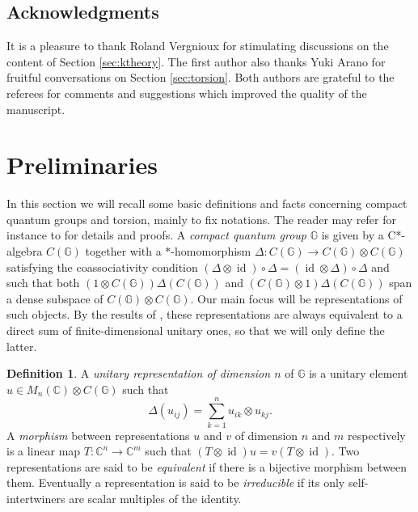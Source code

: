 \documentclass[a4paper, 11pt]{amsart}
\theoremstyle{plain}
\theoremstyle{definition}
\newtheorem{de}[thm]{Definition}
\theoremstyle{remark}
\DeclareMathOperator{\id}{id}
\newcommand{\C}{\mathbb{C}}
\newcommand{\D}{\Delta}
\newcommand{\G}{\mathbb{G}}
\begin{document}
\subsection*{Acknowledgments}

It is a pleasure to thank Roland Vergnioux for stimulating discussions on the content of Section \ref{sec:ktheory}. The first author also thanks Yuki Arano for fruitful conversations on Section \ref{sec:torsion}. Both authors are grateful to the referees for comments and suggestions which improved the quality of the manuscript.

\section{Preliminaries}\label{sec:preliminaries}

In this section we will recall some basic definitions and facts concerning compact quantum groups and torsion, mainly to fix notations. The reader may refer for instance to \cite{neshveyev2014compact} for details and proofs. A \emph{compact quantum group} $\G$ is given by a C*-algebra $C(\G)$ together with a $*$-homomorphism $\D : C(\G) \rightarrow C(\G)\otimes C(\G)$ satisfying the coassociativity condition $(\D\otimes \id)\circ\D = (\id\otimes \D)\circ\D$ and such that both $(1\otimes C(\G))\Delta(C(\G))$ and $(C(\G)\otimes 1)\Delta(C(\G))$ span a dense subspace of $C(\G)\otimes C(\G)$. Our main focus will be representations of such objects. By the results of \cite{woronowicz1987compact}, these representations are always equivalent to a direct sum of finite-dimensional unitary ones, so that we will only define the latter.

\begin{de}
A \emph{unitary representation of dimension $n$} of $\G$ is a unitary element $u\in M_{n}(\C)\otimes C(\G)$ such that
\begin{equation*}
\D(u_{ij}) = \sum_{k=1}^{n}u_{ik}\otimes u_{kj}.
\end{equation*}
A \emph{morphism} between representations $u$ and $v$ of dimension $n$ and $m$ respectively is a linear map $T : \C^{n}\rightarrow \C^{m}$ such that $(T\otimes \id)u = v(T\otimes \id)$. Two representations are said to be \emph{equivalent} if there is a bijective morphism between them. Eventually a representation is said to be \emph{irreducible} if its only self-intertwiners are scalar multiples of the identity.
\end{de}
\end{document}
